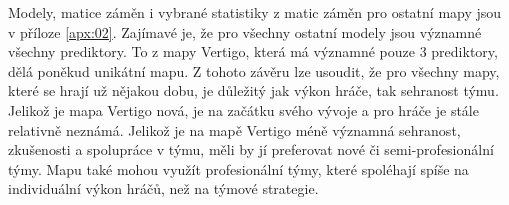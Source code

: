 Modely, matice záměn i vybrané statistiky z matic záměn pro ostatní mapy jsou v příloze \ref{apx:02}. Zajímavé je, že pro všechny ostatní modely
jsou významné všechny prediktory. To z mapy Vertigo, která má významné pouze 3 prediktory, dělá poněkud unikátní mapu. Z tohoto závěru lze usoudit, že
pro všechny mapy, které se hrají už nějakou dobu, je důležitý jak výkon hráče, tak sehranost týmu. Jelikož je mapa Vertigo nová, je na začátku svého
vývoje a pro hráče je stále relativně neznámá. Jelikož je na mapě Vertigo méně významná sehranost, zkušenosti a spolupráce v týmu, měli by jí preferovat
nové či semi-profesionální týmy. Mapu také mohou využít profesionální týmy, které spoléhají spíše na individuální výkon hráčů, než na týmové strategie.